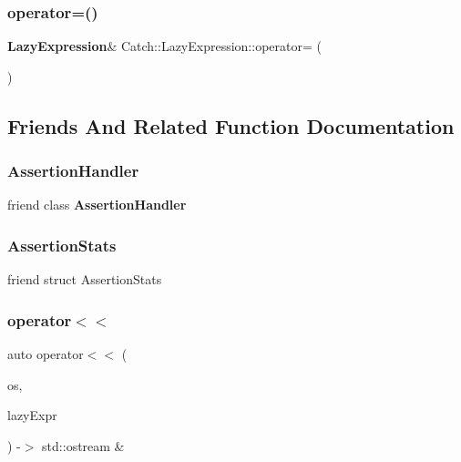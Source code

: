 \subsubsection{operator=()}
{\footnotesize\ttfamily \textbf{ Lazy\+Expression}\& Catch\+::\+Lazy\+Expression\+::operator= (\begin{DoxyParamCaption}\item[{\textbf{ Lazy\+Expression} const \&}]{ }\end{DoxyParamCaption})\hspace{0.3cm}{\ttfamily [delete]}}



\subsection{Friends And Related Function Documentation}
\mbox{\label{class_catch_1_1_lazy_expression_a4301a3aa57b612dd8b6ef8461742ecab}} 
\subsubsection{AssertionHandler}
{\footnotesize\ttfamily friend class \textbf{ Assertion\+Handler}\hspace{0.3cm}{\ttfamily [friend]}}

\mbox{\label{class_catch_1_1_lazy_expression_a64019eb137f5ce447cdc71cb80b6e7a4}} 
\subsubsection{AssertionStats}
{\footnotesize\ttfamily friend struct Assertion\+Stats\hspace{0.3cm}{\ttfamily [friend]}}

\mbox{\label{class_catch_1_1_lazy_expression_aa01086581cab2fcd2d4580b8fa787dfc}} 
\subsubsection{operator$<$$<$}
{\footnotesize\ttfamily auto operator$<$$<$ (\begin{DoxyParamCaption}\item[{std\+::ostream \&}]{os,  }\item[{\textbf{ Lazy\+Expression} const \&}]{lazy\+Expr }\end{DoxyParamCaption}) -\/$>$  std\+::ostream \&\hspace{0.3cm}{\ttfamily [friend]}}


